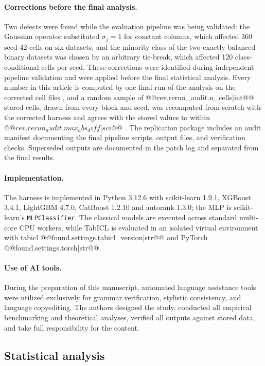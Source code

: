 \documentclass[pdflatex,sn-mathphys]{sn-jnl}
\theoremstyle{thmstyleone}
\theoremstyle{thmstyletwo}
\theoremstyle{thmstylethree}
\begin{document}
\paragraph{Corrections before the final analysis.} Two defects were found while the evaluation pipeline was being validated: the Gaussian operator substituted $\sigma_j=1$ for constant columns, which affected 360 seed-42 cells on six datasets, and the minority class of the two exactly balanced binary datasets was chosen by an arbitrary tie-break, which affected 120 class-conditional cells per seed. These corrections were identified during independent pipeline validation and were applied before the final statistical analysis. Every number in this article is computed by one final run of the analysis on the corrected cell files%
, and a random sample of @@{rev.rerun_audit.n_cells|int}@@ stored cells, drawn from every block and seed, was recomputed from scratch with the corrected harness and agrees with the stored values to within $@@{rev.rerun_audit.max_abs_diff|sci}@@$%
. The replication package includes an audit manifest documenting the final pipeline scripts, output files, and verification checks. Superseded outputs are documented in the patch log and separated from the final results.

\paragraph{Implementation.} The harness is implemented in Python 3.12.6 with scikit-learn 1.9.1, XGBoost 3.4.1, LightGBM 4.7.0, CatBoost 1.2.10 and autorank 1.3.0; the MLP is scikit-learn's \texttt{MLPClassifier}. The classical models are executed across standard multi-core CPU workers, while TabICL is evaluated in an isolated virtual environment with tabicl @@{found.settings.tabicl_version|str}@@ and PyTorch @@{found.settings.torch|str}@@.

\paragraph{Use of AI tools.} During the preparation of this manuscript, automated language assistance tools were utilized exclusively for grammar verification, stylistic consistency, and language copyediting. The authors designed the study, conducted all empirical benchmarking and theoretical analyses, verified all outputs against stored data, and take full responsibility for the content.

\subsection{Statistical analysis}\label{sec:method:stats}
\end{document}
